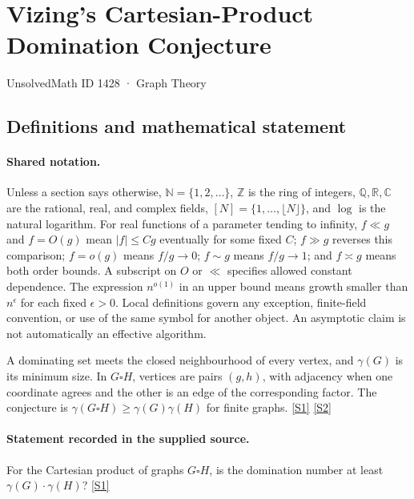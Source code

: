 \documentclass[11pt,a4paper]{article}
\newcommand{\N}{\mathbb{N}}
\newcommand{\Z}{\mathbb{Z}}
\newcommand{\Q}{\mathbb{Q}}
\newcommand{\R}{\mathbb{R}}
\newcommand{\C}{\mathbb{C}}
\newcommand{\sref}[2]{\hyperlink{source:#1:#2}{[S#2]}}
\begin{document}

\setcounter{section}{1427}

\section{Vizing’s Cartesian-Product Domination Conjecture}\label{1428}

{\small\sffamily UnsolvedMath ID 1428 · Graph Theory}

\subsection{Definitions and mathematical statement}

\paragraph{Shared notation.}Unless a section says otherwise, $\N=\{1,2,\ldots\}$,
$\Z$ is the ring of integers, $\Q,\R,\C$ are the rational, real, and complex
fields, $[N]=\{1,\ldots,\lfloor N\rfloor\}$, and $\log$ is the natural
logarithm. For real functions of a parameter tending to infinity,
$f\ll g$ and $f=O(g)$ mean $|f|\leq Cg$ eventually for some fixed $C$;
$f\gg g$ reverses this comparison; $f=o(g)$ means $f/g\to0$;
$f\sim g$ means $f/g\to1$; and $f\asymp g$ means both order bounds.
A subscript on $O$ or $\ll$ specifies allowed constant dependence.
The expression $n^{o(1)}$ in an upper bound means growth smaller than
$n^\epsilon$ for each fixed $\epsilon>0$. Local definitions govern any
exception, finite-field convention, or use of the same symbol for another
object. An asymptotic claim is not automatically an effective algorithm.



A dominating set meets the closed neighbourhood of every vertex, and $\gamma(G)$ is its minimum size. In $G\square H$, vertices are pairs $(g,h)$, with adjacency when one coordinate agrees and the other is an edge of the corresponding factor. The conjecture is $\gamma(G\square H)\geq\gamma(G)\gamma(H)$ for finite graphs. \sref{1428}{1} \sref{1428}{2}

\paragraph{Statement recorded in the supplied source.}
For the Cartesian product of graphs $G \square H$, is the domination number at least $\gamma(G) \cdot \gamma(H)$? \sref{1428}{1}
\end{document}
